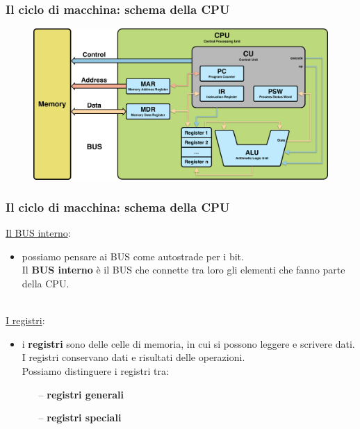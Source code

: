 \begin{frame}
	\frametitle{Il ciclo di macchina: schema della CPU} %
	
	\begin{figure}[!htbp] 
		\centering
		\includegraphics[width=1.0\linewidth]{images/4_cpu/architecture_cpu_complex.pdf}
		\label{fig:cpu_complex}
	\end{figure}
	 
\end{frame}



\begin{frame}
	\frametitle{Il ciclo di macchina: schema della CPU}
	
	\underline{Il BUS interno}:
	\begin{itemize}
		\item possiamo pensare ai BUS come autostrade per i bit.\\
			  Il \textbf{BUS interno} è il BUS che connette tra loro gli elementi che fanno parte della CPU.
	\end{itemize}
	~\\
	\underline{I registri}:
	\begin{itemize}
		\item i \textbf{registri} sono delle celle di memoria, in cui si possono leggere e scrivere dati.\\
		I registri conservano dati e risultati delle operazioni.\\
		Possiamo distinguere i registri tra:
		\begin{itemize}
			\item[--] \textbf{registri generali}
			\item[--] \textbf{registri speciali}
		\end{itemize}
	\end{itemize}
	 
\end{frame}


